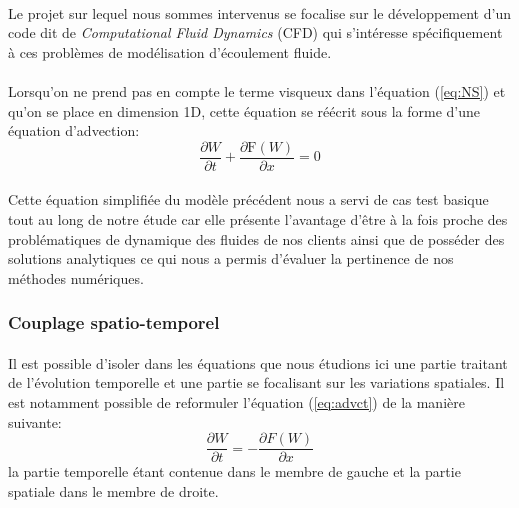     \paragraph{}
    Le projet sur lequel nous sommes intervenus se focalise sur le développement d'un code dit de \emph{Computational Fluid Dynamics} (CFD) qui s'intéresse spécifiquement à ces problèmes de modélisation d'écoulement fluide.

    \paragraph{}
    Lorsqu'on ne prend pas en compte le terme visqueux dans l'équation (\ref{eq:NS}) et qu'on se place en dimension 1D, cette équation se réécrit sous la forme d'une équation d'advection:
    \begin{equation} 
        \frac{\partial W}{\partial t}+\frac{\partial \mathrm{F}(W)}{\partial x}=0
        \label{eq:advct}
    \end{equation}

    \paragraph{}
    Cette équation simplifiée du modèle précédent nous a servi de cas test basique tout au long de notre étude car elle présente l'avantage d'être à la fois proche des problématiques de dynamique des fluides de nos clients ainsi que de posséder des solutions analytiques ce qui nous a permis d'évaluer la pertinence de nos méthodes numériques.

    \subsubsection{Couplage spatio-temporel}
        \paragraph{}
        Il est possible d'isoler dans les équations que nous étudions ici une partie traitant de l'évolution temporelle et une partie se focalisant sur les variations spatiales. Il est notamment possible de reformuler l'équation (\ref{eq:advct}) de la manière suivante:
        \begin{equation}
            \frac{\partial W}{\partial t} = -\frac{\partial F(W)}{\partial x}
            \label{eq:SpTmp}
        \end{equation}
        la partie temporelle étant contenue dans le membre de gauche et la partie spatiale dans le membre de droite.

